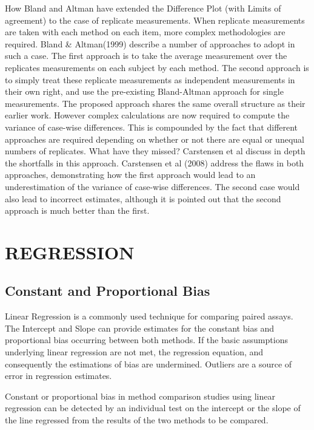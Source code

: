 \documentclass[MAIN.tex]{subfiles}
\begin{document}
\newpage
How Bland and Altman have extended the Difference Plot (with Limits of agreement) to the case of replicate measurements.
When replicate measurements are taken with each method on each item, more complex methodologies are required. Bland \& Altman(1999) describe a number of approaches to adopt in such a case. The first approach is to take the average measurement over the replicates measurements on each subject by each method.
The second approach is to simply treat these replicate measurements as independent measurements in their own right, and use the pre-existing Bland-Altman approach for single measurements.
The proposed approach shares the same overall structure as their earlier work. However complex calculations are now required to compute the variance of case-wise differences. This is compounded by the fact that different approaches are required depending on whether or not there are equal or unequal numbers of replicates.
What have they missed? Carstensen et al discuss in depth the shortfalls in this approach.
Carstensen et al (2008) address the flaws in both approaches, demonstrating how the first approach would lead to an underestimation of the variance of case-wise differences. The second case would also lead to incorrect estimates, although it is pointed out that the second approach is much better than the first.


\chapter{REGRESSION}%

\section{Constant and Proportional Bias}

Linear Regression is a commonly used technique for comparing paired assays. The Intercept and Slope can provide estimates for the constant bias and proportional bias occurring between both methods. If the basic assumptions underlying linear regression are not met, the regression equation, and consequently the estimations
of bias are undermined. Outliers are a source of error in regression estimates.

Constant or proportional bias in method comparison studies using linear regression can be detected by an individual test on the intercept or the slope of the line regressed from the results of the two methods to be compared.
\end{document}
